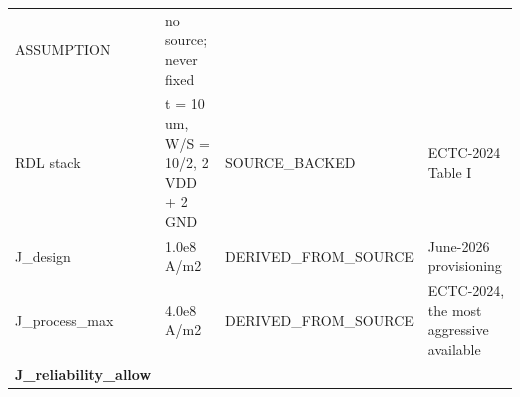 \documentclass[10pt,]{article}
\begin{document}
\begin{longtable}[]{@{}llll@{}}
\begin{minipage}[t]{0.22\columnwidth}
ASSUMPTION\strut
\end{minipage} & \begin{minipage}[t]{0.22\columnwidth}\raggedright
no source; never fixed\strut
\end{minipage}\tabularnewline
\begin{minipage}[t]{0.22\columnwidth}\raggedright
RDL stack\strut
\end{minipage} & \begin{minipage}[t]{0.22\columnwidth}\raggedright
t = 10 um, W/S = 10/2, 2 VDD + 2 GND\strut
\end{minipage} & \begin{minipage}[t]{0.22\columnwidth}\raggedright
SOURCE\_BACKED\strut
\end{minipage} & \begin{minipage}[t]{0.22\columnwidth}\raggedright
ECTC-2024 Table I\strut
\end{minipage}\tabularnewline
\begin{minipage}[t]{0.22\columnwidth}\raggedright
J\_design\strut
\end{minipage} & \begin{minipage}[t]{0.22\columnwidth}\raggedright
1.0e8 A/m2\strut
\end{minipage} & \begin{minipage}[t]{0.22\columnwidth}\raggedright
DERIVED\_FROM\_SOURCE\strut
\end{minipage} & \begin{minipage}[t]{0.22\columnwidth}\raggedright
June-2026 provisioning\strut
\end{minipage}\tabularnewline
\begin{minipage}[t]{0.22\columnwidth}\raggedright
J\_process\_max\strut
\end{minipage} & \begin{minipage}[t]{0.22\columnwidth}\raggedright
4.0e8 A/m2\strut
\end{minipage} & \begin{minipage}[t]{0.22\columnwidth}\raggedright
DERIVED\_FROM\_SOURCE\strut
\end{minipage} & \begin{minipage}[t]{0.22\columnwidth}\raggedright
ECTC-2024, the most aggressive available\strut
\end{minipage}\tabularnewline
\begin{minipage}[t]{0.22\columnwidth}\raggedright
\textbf{J\_reliability\_allow}\strut
\end{minipage} & \begin{minipage}[t]{0.22\columnwidth}\raggedright

\end{minipage}
\end{longtable}
\end{document}
